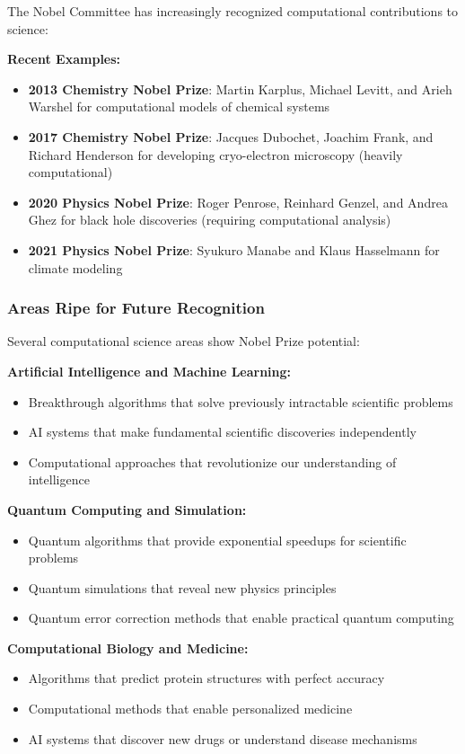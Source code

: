 The Nobel Committee has increasingly recognized computational contributions to science:

\textbf{Recent Examples:}
\begin{itemize}
    \item \textbf{2013 Chemistry Nobel Prize}: Martin Karplus, Michael Levitt, and Arieh Warshel for computational models of chemical systems
    \item \textbf{2017 Chemistry Nobel Prize}: Jacques Dubochet, Joachim Frank, and Richard Henderson for developing cryo-electron microscopy (heavily computational)
    \item \textbf{2020 Physics Nobel Prize}: Roger Penrose, Reinhard Genzel, and Andrea Ghez for black hole discoveries (requiring computational analysis)
    \item \textbf{2021 Physics Nobel Prize}: Syukuro Manabe and Klaus Hasselmann for climate modeling
\end{itemize}

\subsubsection{Areas Ripe for Future Recognition}

Several computational science areas show Nobel Prize potential:

\textbf{Artificial Intelligence and Machine Learning:}
\begin{itemize}
    \item Breakthrough algorithms that solve previously intractable scientific problems
    \item AI systems that make fundamental scientific discoveries independently
    \item Computational approaches that revolutionize our understanding of intelligence
\end{itemize}

\textbf{Quantum Computing and Simulation:}
\begin{itemize}
    \item Quantum algorithms that provide exponential speedups for scientific problems
    \item Quantum simulations that reveal new physics principles
    \item Quantum error correction methods that enable practical quantum computing
\end{itemize}

\textbf{Computational Biology and Medicine:}
\begin{itemize}
    \item Algorithms that predict protein structures with perfect accuracy
    \item Computational methods that enable personalized medicine
    \item AI systems that discover new drugs or understand disease mechanisms
\end{itemize}

